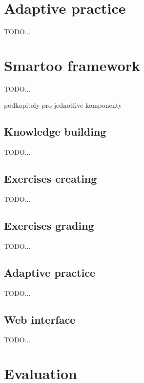 \documentclass[a4paper, 12pt, twoside]{fithesis2}		%
\renewcommand{\_}{\leavevmode \kern0.0em\vbox{\hrule width0.4em}}
\begin{document}
\chapter{Adaptive practice}
\label{chap:practice}

TODO...

\chapter{Smartoo framework}
\label{chap:smartoo}

TODO...

podkapitoly pro jednotlive komponenty

\section{Knowledge building}
\label{sec:smartoo-knowledge}

TODO...

\section{Exercises creating}
\label{sec:smartoo-exercises}

TODO...

\section{Exercises grading}
\label{sec:smartoo-exercises-grading}

TODO...

\section{Adaptive practice}
\label{sec:smartoo-practice}


TODO...

\section{Web interface}
\label{sec:smartoo-web}


TODO...

\chapter{Evaluation}
\label{chap:evaluation}
\end{document}
